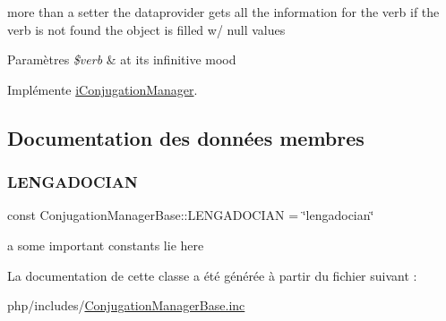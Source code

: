 more than a setter the dataprovider gets all the information for the verb if the verb is not found the object is filled w/ null values 


\begin{DoxyParams}{Paramètres}
{\em \$verb} & at its infinitive mood \\
\hline
\end{DoxyParams}


Implémente \hyperlink{interfaceiConjugationManager_a1b56822fc7f5f7b7b9c0b0c406993b3c}{i\+Conjugation\+Manager}.



\subsection{Documentation des données membres}
\hypertarget{classConjugationManagerBase_aa525010174d498dcf8d808cd3260ec02}{}\label{classConjugationManagerBase_aa525010174d498dcf8d808cd3260ec02} 
\subsubsection{\texorpdfstring{L\+E\+N\+G\+A\+D\+O\+C\+I\+AN}{LENGADOCIAN}}
{\footnotesize\ttfamily const Conjugation\+Manager\+Base\+::\+L\+E\+N\+G\+A\+D\+O\+C\+I\+AN = \char`\"{}lengadocian\char`\"{}}

a some important constants lie here 

La documentation de cette classe a été générée à partir du fichier suivant \+:\begin{DoxyCompactItemize}
\item 
php/includes/\hyperlink{ConjugationManagerBase_8inc}{Conjugation\+Manager\+Base.\+inc}\end{DoxyCompactItemize}
